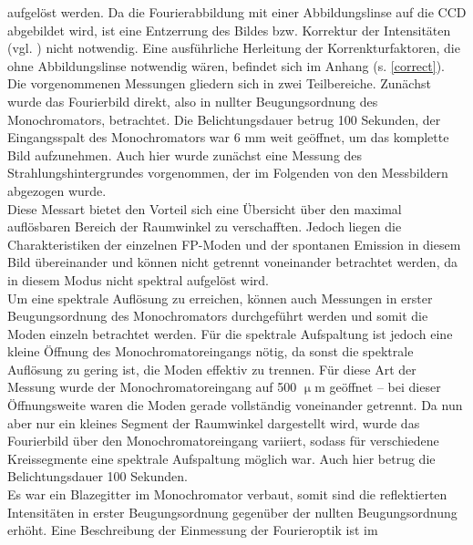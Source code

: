 aufgelöst werden. Da die Fourierabbildung mit einer Abbildungslinse auf die CCD
abgebildet wird, ist eine Entzerrung des Bildes bzw. Korrektur der Intensitäten
(vgl. \cite{Roeder.Diss,Riediger.Master}) nicht notwendig. Eine ausführliche
Herleitung der Korrenkturfaktoren, die ohne Abbildungslinse notwendig wären,
befindet sich im Anhang (s. \autoref{correct}). \\ Die vorgenommenen Messungen
gliedern sich in zwei Teilbereiche. Zunächst wurde das Fourierbild direkt, also
in nullter Beugungsordnung des Monochromators, betrachtet. Die Belichtungsdauer
betrug 100 Sekunden, der Eingangsspalt des Monochromators war 6 mm weit
geöffnet, um das komplette Bild aufzunehmen. Auch hier wurde zunächst eine
Messung des Strahlungshintergrundes vorgenommen, der im Folgenden von den
Messbildern abgezogen wurde.\\ Diese Messart bietet den Vorteil sich eine
Übersicht über den maximal auflösbaren Bereich der Raumwinkel zu verschafften.
Jedoch liegen die Charakteristiken der einzelnen FP-Moden und der spontanen
Emission in diesem Bild übereinander und können nicht getrennt voneinander
betrachtet werden, da in diesem Modus nicht spektral aufgelöst wird.\\ Um eine
spektrale Auflösung zu erreichen, können auch Messungen in erster
Beugungsordnung des Monochromators durchgeführt werden und somit die Moden
einzeln betrachtet werden. Für die spektrale Aufspaltung ist jedoch eine kleine
Öffnung des Monochromatoreingangs nötig, da sonst die spektrale Auflösung zu
gering ist, die Moden effektiv zu trennen. Für diese Art der Messung wurde der
Monochromatoreingang auf 500 $\upmu$m geöffnet – bei dieser Öffnungsweite waren
die Moden gerade vollständig voneinander getrennt. Da nun aber nur ein kleines
Segment der Raumwinkel dargestellt wird, wurde das Fourierbild über den
Monochromatoreingang variiert, sodass für verschiedene Kreissegmente eine
spektrale Aufspaltung möglich war. Auch hier betrug die Belichtungsdauer 100
Sekunden.\\ Es war ein Blazegitter im Monochromator verbaut, somit sind die
reflektierten Intensitäten in erster Beugungsordnung gegenüber der nullten
Beugungsordnung erhöht. Eine Beschreibung der Einmessung der Fourieroptik ist im
